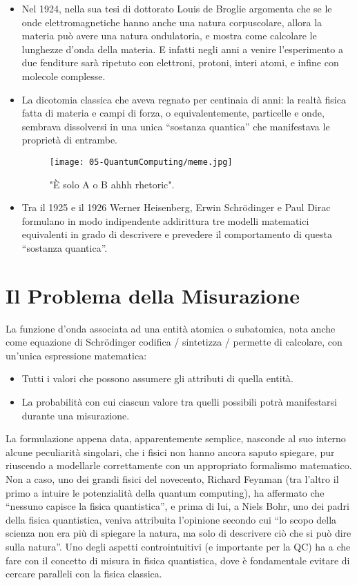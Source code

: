 \begin{itemize}
\item Nel 1924, nella sua tesi di dottorato Louis de Broglie argomenta che
se le onde elettromagnetiche hanno anche una natura corpuscolare,
allora la materia può avere una natura ondulatoria, e mostra come
calcolare le lunghezze d’onda della materia. E infatti negli anni a venire l’esperimento a due fenditure sarà ripetuto
con elettroni, protoni, interi atomi, e infine con molecole complesse. 
\item La dicotomia classica che aveva regnato per centinaia di anni:
la realtà fisica fatta di materia e campi di forza, o equivalentemente,
particelle e onde, sembrava dissolversi in una unica “sostanza
quantica” che manifestava le proprietà di entrambe.
\begin{figure}[h]
    \centering
    \texttt{[image: 05-QuantumComputing/meme.jpg]}
    \caption{"È solo A o B ahhh rhetoric".}
\end{figure}
\item Tra il 1925 e il 1926 Werner Heisenberg, Erwin Schrödinger e
Paul Dirac formulano in modo indipendente addirittura tre modelli
matematici equivalenti in grado di descrivere e prevedere
il comportamento di questa “sostanza quantica”.
\end{itemize}

\section{Il Problema della Misurazione}

 La funzione d’onda associata ad una entità atomica o subatomica,
nota anche come equazione di Schr\"odinger codifica / sintetizza /
permette di calcolare, con un’unica espressione matematica:
\begin{itemize}
  \item Tutti i valori che possono assumere gli attributi di quella entità. 
  \item La probabilità con cui ciascun valore tra quelli possibili potrà
manifestarsi durante una misurazione.
\end{itemize}

La formulazione appena data, apparentemente semplice, nasconde al
suo interno alcune peculiarità singolari, che i fisici non hanno ancora
saputo spiegare, pur riuscendo a modellarle correttamente con un
appropriato formalismo matematico. Non a caso, uno dei grandi fisici del novecento, Richard Feynman (tra
l’altro il primo a intuire le potenzialità della quantum computing), ha
affermato che “nessuno capisce la fisica quantistica”, e prima di lui, a
Niels Bohr, uno dei padri della fisica quantistica, veniva attribuita
l’opinione secondo cui “lo scopo della scienza non era più di spiegare
la natura, ma solo di descrivere ciò che si può dire sulla natura”. Uno degli aspetti controintuitivi (e importante per la QC) ha
a che fare con il concetto di misura in fisica quantistica, dove
è fondamentale evitare di cercare paralleli con la fisica classica. 

